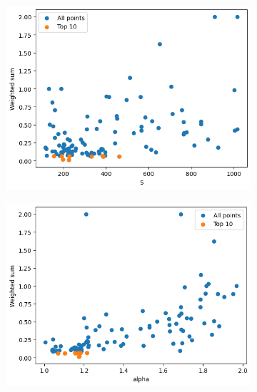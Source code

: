 \begin{frame}
\begin{figure}

        \hfill
        \begin{subfigure}{0.45\textwidth}
            \includegraphics[width=\textwidth]{../images/report/w111-S.png}
        \end{subfigure}
        \hfill
        \begin{subfigure}{0.45\textwidth}
            \includegraphics[width=\textwidth]{../images/report/w111-alpha.png}
        \end{subfigure}
        \hfill
    \end{figure}
\end{frame}

